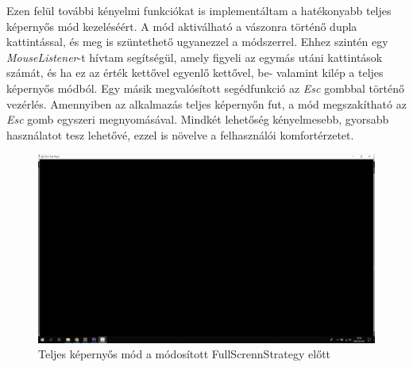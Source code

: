 Ezen felül további kényelmi funkciókat is implementáltam a hatékonyabb teljes képernyős mód kezeléséért. A mód aktiválható a vászonra történő dupla kattintással, és meg is szüntethető ugyanezzel a módszerrel. Ehhez szintén egy \textit{MouseListener}-t hívtam segítségül, amely figyeli az egymás utáni kattintások számát, és ha ez az érték kettővel egyenlő kettővel, be- valamint kilép a teljes képernyős módból. Egy másik megvalósított segédfunkció az \textit{Esc} gombbal történő vezérlés. Amennyiben az alkalmazás teljes képernyőn fut, a mód megszakítható az \textit{Esc} gomb egyszeri megnyomásával. Mindkét lehetőség kényelmesebb, gyorsabb használatot tesz lehetővé, ezzel is növelve a felhasználói komfortérzetet.

\begin{figure}
  \includegraphics[width=\linewidth]{images/full_screen.jpg}
  \caption{Teljes képernyős mód a módosított FullScrennStrategy előtt}
  \label{fig:full_screen}
\end{figure}

